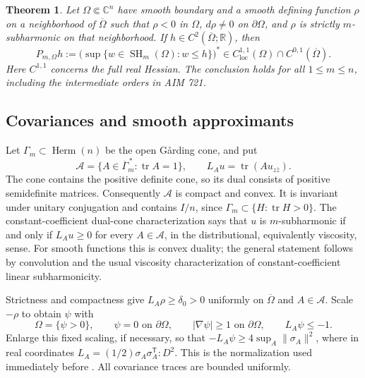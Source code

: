 \documentclass[11pt,a4paper]{article}
\newtheorem{theorem}{Theorem}[section]
\theoremstyle{remark}
\begin{document}
\begin{theorem}
\label{thm:721}
Let $\Omega\Subset\mathbb C^n$ have smooth boundary and a smooth defining
function $\rho$ on a neighborhood of $\overline\Omega$ such that
$\rho<0$ in $\Omega$, $d\rho\ne0$ on $\partial\Omega$, and $\rho$ is
strictly $m$-subharmonic on that neighborhood.  If
$h\in C^2(\overline\Omega;\mathbb R)$, then
\begin{equation}
 P_{m,\Omega}h
 :=\bigl(\sup\{w\in\operatorname{SH}_m(\Omega):w\le h\}\bigr)^*
 \in C^{1,1}_{\mathrm{loc}}(\Omega)\cap C^{0,1}(\overline\Omega).
 \label{eq:721-1}
\end{equation}
Here $C^{1,1}$ concerns the full real Hessian.  The conclusion holds for all
$1\le m\le n$, including the intermediate orders in AIM 721.
\end{theorem}

\subsection{Covariances and smooth approximants}

Let $\Gamma_m\subset\operatorname{Herm}(n)$ be the open G\aa rding cone,
and put
\begin{equation}
 \mathcal A=\{A\in\overline\Gamma_m^{\,*}:\operatorname{tr}A=1\},
 \qquad L_Au=\operatorname{tr}(Au_{z\bar z}).
 \label{eq:721-2}
\end{equation}
The cone contains the positive definite cone, so its dual consists of positive
semidefinite matrices.  Consequently $\mathcal A$ is compact and convex.
It is invariant under unitary conjugation and contains $I/n$, since
$\Gamma_m\subset\{H:\operatorname{tr}H>0\}$.  The constant-coefficient
dual-cone characterization says that $u$ is $m$-subharmonic if and only if
$L_Au\ge0$ for every $A\in\mathcal A$, in the distributional, equivalently
viscosity, sense.  For smooth functions this is convex duality; the general
statement follows by convolution and the usual viscosity characterization of
constant-coefficient linear subharmonicity.

Strictness and compactness give $L_A\rho\ge\delta_0>0$ uniformly on
$\overline\Omega$ and $A\in\mathcal A$.  Scale $-\rho$ to obtain $\psi$
with
\begin{equation}
 \Omega=\{\psi>0\},\qquad \psi=0\text{ on }\partial\Omega,
 \qquad |\nabla\psi|\ge1\text{ on }\partial\Omega,
 \qquad L_A\psi\le-1.
 \label{eq:721-3}
\end{equation}
Enlarge this fixed scaling, if necessary, so that
$-L_A\psi\ge4\sup_A\|\sigma_A\|^2$, where in real coordinates
$L_A=(1/2)\sigma_A\sigma_A^{\mathsf T}:D^2$.  This is the normalization
used immediately before \cite[Lemma 7.1]{ZhouBellman2015}.
All covariance traces are bounded uniformly.
\end{document}
